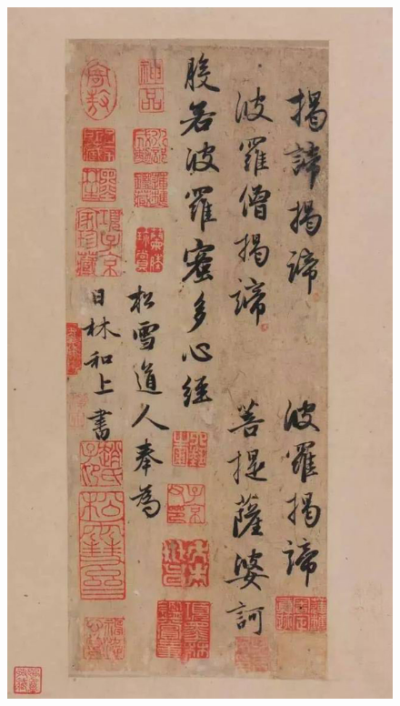 \documentclass[a4paper,twoside]{article}
\begin{document}
\begin{figure}[ht]
\centering
\includegraphics[width=13.2cm]{images/zhaomengfu-5}
\end{figure}
\cleardoublepage
\end{document}
